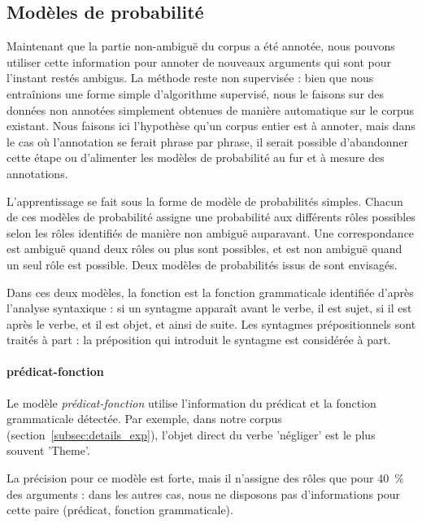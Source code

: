 
\subsection{Modèles de probabilité}
\label{subsec:probability}

Maintenant que la partie non-ambiguë du corpus a été annotée, nous pouvons
utiliser cette information pour annoter de nouveaux arguments qui sont pour
l'instant restés ambigus. La méthode reste non supervisée : bien que nous
entraînions une forme simple d'algorithme supervisé, nous le faisons sur des
données non annotées simplement obtenues de manière automatique sur le corpus
existant. Nous faisons ici l'hypothèse qu'un corpus entier est à annoter, mais
dans le cas où l'annotation se ferait phrase par phrase, il serait possible
d'abandonner cette étape ou d'alimenter les modèles de probabilité au fur et à
mesure des annotations.

L'apprentissage se fait sous la forme de modèle de probabilités simples.
Chacun de ces modèles de probabilité assigne une probabilité aux différents
rôles possibles selon les rôles identifiés de manière non ambiguë auparavant.
Une correspondance est ambiguë quand deux rôles ou plus sont possibles, et est
non ambiguë quand un seul rôle est possible. Deux modèles de probabilités issus
de \citep{swier2005exploiting} sont envisagés.


Dans ces deux modèles, la fonction est la fonction grammaticale identifiée
d'après l'analyse syntaxique : si un syntagme apparaît avant le verbe, il est
sujet, si il est après le verbe, et il est objet, et ainsi de suite. Les
syntagmes prépositionnels sont traités à part : la préposition qui introduit le
syntagme est considérée à part.

\paragraph{prédicat-fonction}

Le modèle \emph{prédicat-fonction} utilise l'information du prédicat et la
fonction grammaticale détectée. Par exemple, dans notre corpus
(section~\ref{subsec:details_exp}), l'objet direct du verbe 'négliger' est le
plus souvent 'Theme'.

La précision pour ce modèle est forte, mais il n'assigne des rôles que pour
40~\% des arguments : dans les autres cas, nous ne disposons pas d'informations
pour cette paire (prédicat, fonction grammaticale).

